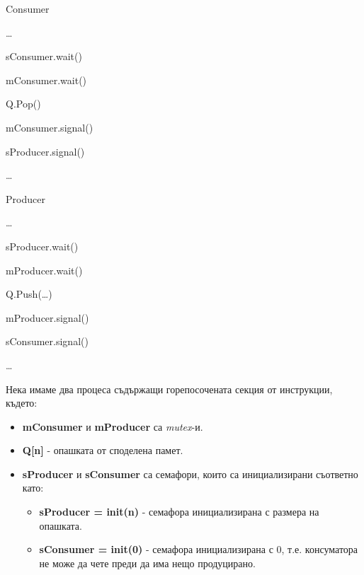 \documentclass[fleqn,12pt]{article}
\begin{document}
    \begin{multicols}{2}
        Consumer
    
        \dots
    
        sConsumer.wait()

        mConsumer.wait()
        
        Q.Pop()

        mConsumer.signal()
        
        sProducer.signal()

        \dots
    
    \columnbreak
        Producer
        
        \dots
        
        sProducer.wait()

        mProducer.wait()
        
        Q.Push(\dots)

        mProducer.signal()
        
        sConsumer.signal()

        \dots
    
    \end{multicols}


    Нека имаме два процеса съдържащи горепосочената секция от инструкции, където:
    \begin{itemize}
        \item \textbf{mConsumer} и \textbf{mProducer} са \textit{mutex}-и.
        \item \textbf{Q[n]} - опашката от споделена памет.
        \item \textbf{sProducer} и \textbf{sConsumer} са семафори, които са инициализирани съответно като:
        \begin{itemize}
            \item \textbf{sProducer = init(n)} - семафора инициализирана с размера на опашката.
            \item \textbf{sConsumer = init(0)} - семафора инициализирана с 0, т.е. консуматора не може да чете преди да има нещо продуцирано.
        \end{itemize}
    \end{itemize}
\end{document}
